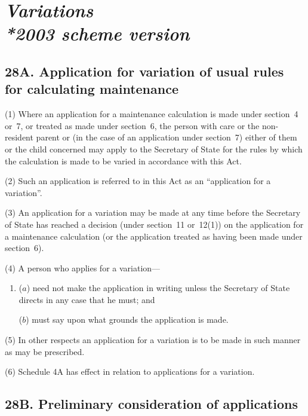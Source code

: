 \documentclass[12pt,a4paper]{article}
\begin{document}
\section[\itshape Variations --- \emph{2003 scheme version}]{\itshape Variations\\*\emph{2003 scheme version}}

\subsection{28A. Application for variation of usual rules for calculating maintenance}

(1) Where an application for a maintenance calculation is made under section~4 or~7, or treated as made under section~6, the person with care or the non-resident parent or (in the case of an application under section~7) either of them or the child concerned may apply to the Secretary of State for the rules by which the calculation is made to be varied in accordance with this Act.

(2) Such an application is referred to in this Act as an “application for a variation”.

(3) An application for a variation may be made at any time before the Secretary of State has reached a decision (under section~11 or~12(1)) on the application for a maintenance calculation (or the application treated as having been made under section~6).

(4) A person who applies for a variation—
\begin{enumerate}\item[]
($a$) need not make the application in writing unless the Secretary of State directs in any case that he must; and

($b$) must say upon what grounds the application is made.
\end{enumerate}

(5) In other respects an application for a variation is to be made in such manner as may be prescribed.

(6) Schedule 4A has effect in relation to applications for a variation.


\subsection{28B. Preliminary consideration of applications}
\end{document}
